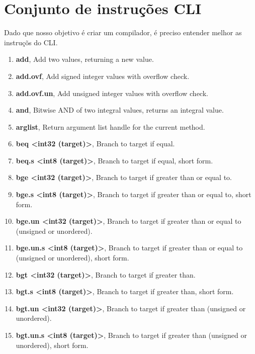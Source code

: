 \documentclass[12pt,a4paper,twoside]{report}
\begin{document}
\section{Conjunto de instruções CLI}
Dado que nosso objetivo é criar um compilador, é preciso entender melhor as instruçõs do CLI.

\begin{enumerate}
\item \textbf{add}, Add two values, returning a new value.
\item \textbf{add.ovf}, Add signed integer values with overflow check.
\item \textbf{add.ovf.un}, Add unsigned integer values with overflow check.
\item \textbf{and}, Bitwise AND of two integral values, returns an integral value.
\item \textbf{arglist}, Return argument list handle for the current method.
\item \textbf{beq <int32 (target)>}, Branch to target if equal.
\item \textbf{beq.s <int8 (target)>}, Branch to target if equal, short form.
\item \textbf{bge <int32 (target)>}, Branch to target if greater than or equal to.
\item \textbf{bge.s <int8 (target)>}, Branch to target if greater than or equal to, short form.
\item \textbf{bge.un <int32 (target)>}, Branch to target if greater than or equal to (unsigned or
unordered).
\item \textbf{bge.un.s <int8 (target)>}, Branch to target if greater than or equal to (unsigned or
unordered), short form.
\item \textbf{bgt <int32 (target)>}, Branch to target if greater than.
\item \textbf{bgt.s <int8 (target)>}, Branch to target if greater than, short form.
\item \textbf{bgt.un <int32 (target)>}, Branch to target if greater than (unsigned or unordered).
\item \textbf{bgt.un.s <int8 (target)>}, Branch to target if greater than (unsigned or unordered),
short form.


\end{enumerate}
\end{document}
